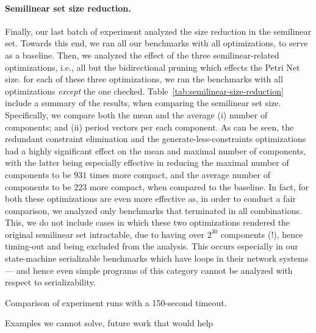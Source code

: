 \paragraph{Semilinear set size reduction.}

Finally, our last batch of experiment analyzed the size reduction in the semilinear set.
%
Towards this end, we ran all our benchmarks with all optimizations, to serve as a baseline. 
%
Then, we analyzed the effect of the three semilinear-related optimizations, i.e., all but the bidirectional pruning which effects the Petri Net size. for each of these three optimizations, we ran the benchmarks with all optimizations \textit{except} the one checked.
%
Table~\ref{tab:semilinear-size-reduction} include a summary of the results, when comparing the semilinear set size.
%
Specifically, we compare both the mean and the average (i) number of components; and (ii) period vectors per each component.
%
As can be seen, the redundant constraint elimination and the generate-less-constraints optimizations had a highly significant effect on the mean and maximal number of components, with the latter being especially effective in reducing the maximal number of components to be $931$ times more compact, and the average number of components to be $223$ more compact, when compared to the baseline.
%
In fact, for both these optimizations are even more effective as, in order to conduct a fair comparison, we analyzed only benchmarks that terminated in all combinations.
%
This, we do not include cases in which these two optimizations rendered the original semilinear set intractable, due to having over $2^30$ components (!), hence timing-out and being excluded from the analysis.
%
This occurs especially in our state-machine serializable benchmarks which have loops in their network systems --- and hence even simple programs of this category cannot be analyzed with respect to serializability.



\begin{table}[htbp]
	\centering
	
	\caption{Comparison of experiment runs with a 150-second timeout.}
	\label{tab:semilinear-size-reduction}
\end{table}

Examples we cannot solve, future work that would help

\newpage



